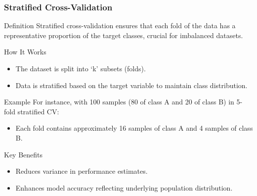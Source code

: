 \documentclass[aspectratio=169]{beamer}
\begin{document}
\begin{frame}[fragile]
    \frametitle{Stratified Cross-Validation}
    \begin{block}{Definition}
        Stratified cross-validation ensures that each fold of the data has a representative proportion of the target classes, crucial for imbalanced datasets.
    \end{block}
    
    \begin{block}{How It Works}
        \begin{itemize}
            \item The dataset is split into ‘k’ subsets (folds).
            \item Data is stratified based on the target variable to maintain class distribution.
        \end{itemize}
    \end{block}

    \begin{block}{Example}
        For instance, with 100 samples (80 of class A and 20 of class B) in 5-fold stratified CV:
        \begin{itemize}
            \item Each fold contains approximately 16 samples of class A and 4 samples of class B.
        \end{itemize}
    \end{block}

    \begin{block}{Key Benefits}
        \begin{itemize}
            \item Reduces variance in performance estimates.
            \item Enhances model accuracy reflecting underlying population distribution.
        \end{itemize}
    \end{block}
\end{frame}
\end{document}

